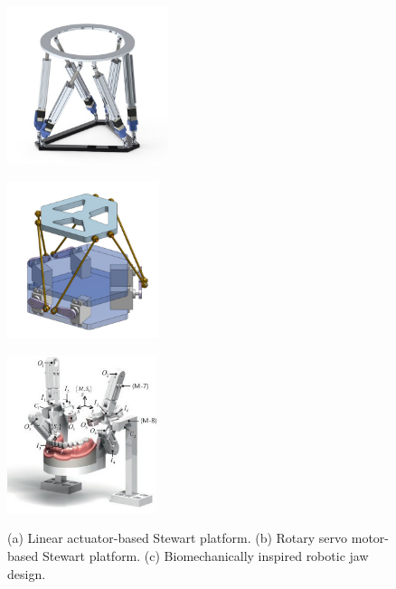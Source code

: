 \begin{figure}[H]
\centering
\begin{minipage}{.3\textwidth}
  \centering
  \includegraphics[height=4.6cm]{figures/linear_stewart_platform_2.jpg}
  \subcaption{}
  \label{fig:linear_stewart_platform}
\end{minipage}
\begin{minipage}{.3\textwidth}
  \centering
  \includegraphics[height=4.6cm]{figures/rotary-stewart-plateform.jpg}
  \subcaption{}
  \label{fig:rotary_stewart_platform}
\end{minipage}
\begin{minipage}{.3\textwidth}
  \centering
  \includegraphics[height=4.6cm]{figures/6dof_jaw_cad.jpg}
  \subcaption{}
  \label{fig:biomechanically_inspired_design}
\end{minipage}
\caption{(a) Linear actuator-based Stewart platform. (b) Rotary servo motor-based Stewart platform. (c) Biomechanically inspired robotic jaw design\cite{ChewingRobotLinearActuator}.}
\label{fig:stewart_platforms}
\end{figure}

